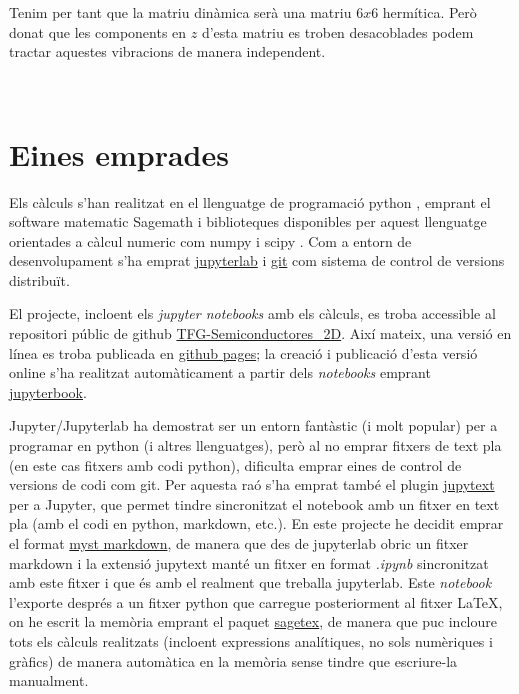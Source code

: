 \documentclass[12pt]{article} %
\let\vec\mathbf %
\begin{document}
Tenim per tant que la matriu dinàmica serà una matriu $6x6$ hermítica. Però donat que les components en $z$ d'esta matriu es troben desacoblades podem tractar aquestes vibracions de manera independent.

 


\


\newpage
\section{Eines emprades}

Els càlculs s'han realitzat en el llenguatge de programació python \cite{4160250}, emprant el software matematic Sagemath \cite{sagemath} i biblioteques disponibles per aquest llenguatge orientades a càlcul numeric com numpy \cite{harris2020array} i scipy \cite{2020SciPy-NMeth}. Com a entorn de desenvolupament s'ha emprat \href{https://jupyter.org/}{jupyterlab} i \href{https://git-scm.com/}{git} com sistema de control de versions distribuït. 

El projecte, incloent els \textit{\foreignlanguage{english}{jupyter notebooks}} amb els càlculs, es troba accessible al repositori públic de github \href{https://github.com/CasimirVictoria/TFG-Semiconductores\_2D}{TFG-Semiconductores\_2D}. Així mateix, una versió en línea  es troba publicada en \href{https://casimirvictoria.github.io/TFG-Semiconductores_2D/index.html}{github pages}; la creació i publicació d'esta versió online s'ha realitzat automàticament a partir dels \textit{notebooks} emprant \href{https://jupyterbook.org/intro.html}{jupyterbook}.

Jupyter/Jupyterlab ha demostrat ser un entorn fantàstic (i molt popular) per a programar en python (i altres llenguatges), però al no emprar fitxers de text pla (en este cas fitxers amb codi python), dificulta emprar eines de control de versions de codi com git. Per aquesta raó s’ha emprat també el plugin \href{https://jupytext.readthedocs.io/en/latest/}{jupytext} per a Jupyter, que permet tindre sincronitzat el notebook amb un fitxer en text pla (amb el codi en python, markdown, etc.). En este projecte he decidit emprar el format \href{https://jupyterbook.org/content/myst.html}{myst markdown}, de manera que des de jupyterlab obric un fitxer markdown i la extensió jupytext manté un fitxer en format \textit{.ipynb} sincronitzat amb este fitxer i que és amb el realment que treballa jupyterlab. Este \emph{notebook} l'exporte després a un fitxer python que carregue posteriorment al fitxer \LaTeX, on he escrit la memòria emprant el paquet \href{https://ctan.org/pkg/sagetex}{sagetex}, de manera que puc incloure tots els càlculs realitzats (incloent expressions analítiques, no sols numèriques i gràfics) de manera automàtica en la memòria sense tindre que escriure-la manualment.
\end{document}
